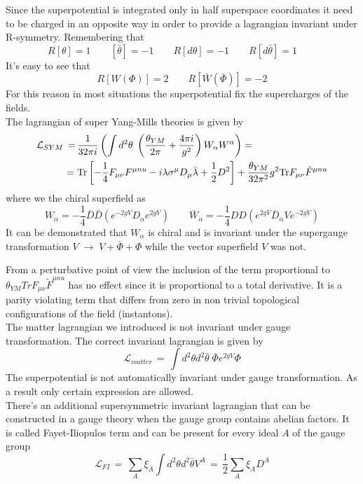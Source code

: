 \begin{appendices}
Since the superpotential is integrated only in half superspace coordinates it need to be charged in an opposite way in order to provide a lagrangian invariant under R-symmetry.
Remembering  that
\begin{equation}
R[\theta] = 1 \qquad [\bar{\theta}] = - 1 \qquad R[d\theta] = -1 \qquad R [d \bar{\theta}] = 1 \qquad
\end{equation}
It's easy to see that 
\begin{equation}
R[W(\Phi)] = 2 \qquad R[\bar{W}(\bar{\Phi})] = -2
\end{equation}
For this reason in most situations the superpotential fix the supercharges of the fields.
\\
The lagrangian of super Yang-Mills theories is given by
\begin{align}
\mathcal{L}_{SYM} \, = \, & \frac{1}{32 \pi i  } \left( \int d^2 \theta \; \left( \frac{\theta_{YM}}{2 \pi}   + \frac{4 \pi i}{g^2} \right) W_{\alpha} W^{\alpha} \right) 
= 
\\
= \; & \hbox{Tr} \left[ -\frac{1}{4} F_{ \mu \nu} F^{\mu nu } - i \lambda \sigma^{\mu} D_{\mu} \bar{\lambda}  + \frac{1}{2} D^2 \right] + \frac{\theta_{YM}}{32 \pi^2 }g^2 \hbox{Tr} F_{ \mu \nu} \tilde{F}^{\mu nu } 
\end{align}
where we the chiral superfield as
\begin{equation}
 W_{\alpha} = - \frac{1}{4} \bar{D} \bar{D}\left(e^{-2 g V}  D_{\alpha}  e^{2g V} \right) \qquad  
\bar{W}_{\dot{\alpha}} = - \frac{1}{4} D D \left(   e^{2gV} \bar{D}_{\dot{\alpha}} V e^{-2gV} \right)  
\end{equation}
It can be demonstrated that $W_{\alpha}$ is chiral and is invariant under the supergauge transformation $V \; \rightarrow \; V + \bar{\Phi} + \Phi$ while the vector superfield $V$ was not.

From a perturbative point of view the inclusion of the term proportional to $\theta_{YM} {Tr} F_{ \mu \nu} \tilde{F}^{\mu nu }  $ has no effect since it is proportional to a total derivative. 
It is a parity violating term that differs from zero in non trivial topological configurations of the field (instantons).
\\
The matter lagrangian we introduced is not invariant under gauge transformation.
The correct invariant lagrangian is given by
\begin{equation}
 \mathcal{L}_{matter} \, = \, \int d^2 \theta d^2 \bar{\theta} \; \bar{\Phi} e^{ 2 g V} \Phi 
\end{equation}
The superpotential is not automatically invariant under gauge transformation. As a result only certain expression are allowed.
\\
There's an additional supersymmetric invariant lagrangian that can be constructed in a gauge theory when the gauge group contains abelian factors. 
It is called Fayet-Iliopulos term and can be present for every ideal $A$ of the gauge group
\begin{equation}
 \mathcal{L}_{FI} \, = \, \sum_{A} \xi_A \int d^2 \theta d^2 \bar{\theta} V^{A} \, = \, \frac{1}{2} \sum_{A} \xi_A D^A
 \end{equation}




\end{appendices}
